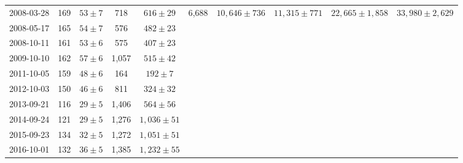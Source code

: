 \documentclass[12pt,letterpaper]{article}
\begin{document}
\begin{landscape}
\begin{longtable}{cccccccccc}
 {2008-03-28} &  169 &    {$53  \pm  7$} &    718 &     {$616 \pm 29$} &  6,688 &    {$10,646 \pm 736$} &    {$11,315 \pm 771$} &  {$22,665 \pm 1,858$} &  {$33,980 \pm 2,629$} \\
 {2008-05-17} &  165 &    {$54  \pm  7$} &    576 &     {$482 \pm 23$} &        &                       &                       &                       &                       \\
 {2008-10-11} &  161 &    {$53  \pm  6$} &    575 &     {$407 \pm 23$} &        &                       &                       &                       &                       \\
 {2009-10-10} &  162 &    {$57  \pm  6$} &  1,057 &     {$515 \pm 42$} &        &                       &                       &                       &                       \\
 {2011-10-05} &  159 &    {$48  \pm  6$} &    164 &      {$192 \pm 7$} &        &                       &                       &                       &                       \\
 {2012-10-03} &  150 &    {$46  \pm  6$} &    811 &     {$324 \pm 32$} &        &                       &                       &                       &                       \\
 {2013-09-21} &  116 &    {$29  \pm  5$} &  1,406 &     {$564 \pm 56$} &        &                       &                       &                       &                       \\
 {2014-09-24} &  121 &    {$29  \pm  5$} &  1,276 &   {$1,036 \pm 51$} &        &                       &                       &                       &                       \\
 {2015-09-23} &  134 &    {$32  \pm  5$} &  1,272 &   {$1,051 \pm 51$} &        &                       &                       &                       &                       \\
 {2016-10-01} &  132 &    {$36  \pm  5$} &  1,385 &   {$1,232 \pm 55$} &        &                       &                       &                       &                       \\
		
	\end{longtable}
	
	
	
	\clearpage
	

\end{landscape}
\end{document}
